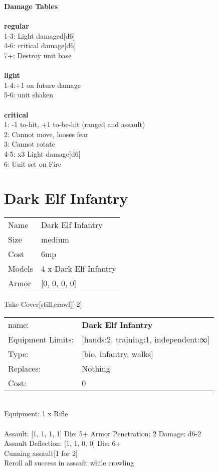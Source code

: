 {\bf Damage Tables} \\
\ \\ {\bf regular } \\
1-3: Light damaged[d6] \\
4-6: critical damage[d6] \\
7+: Destroy unit base \\
\ \\ {\bf light } \\
1-4:+1 on future damage \\
5-6: unit shaken \\
\ \\ {\bf critical } \\
1: -1 to-hit, +1 to-be-hit (ranged and assault) \\
2: Cannot move, looses fear \\
3: Cannot rotate \\
4-5: x3 Light damage[d6] \\
6: Unit set on Fire \\










\pagebreak\pagebreak

\section{ Dark Elf Infantry }

\begin{tabular}{ll}
  Name & Dark Elf Infantry \\
  Size & medium\\
  Cost & 6mp\\
  Models & 4 x Dark Elf Infantry\\
  Armor & [0, 0, 0, 0]\\
\end{tabular}

\noindent Take-Cover[still,crawl][-2]\\ 


\noindent
\begin{tabular}{ll}
name: &{\bf Dark Elf Infantry } \\
Equipment Limits: &[hands:2, training:1, independent:∞] \\
Type: &[bio, infantry, walks] \\
Replaces: &Nothing \\
Cost: & 0\\
\end{tabular}
\ \\
Equipment: 1 x Rifle \\
\ \\
Assault: [1, 1, 1, 1] Die: 5+ Armor Penetration: 2 Damage: d6-2 \\
Assault Deflection: [1, 1, 0, 0] Die: 6+\\
\indent Cunning assault[1 for 2]\\ 
Reroll all success in assault while crawling\\ 
 
